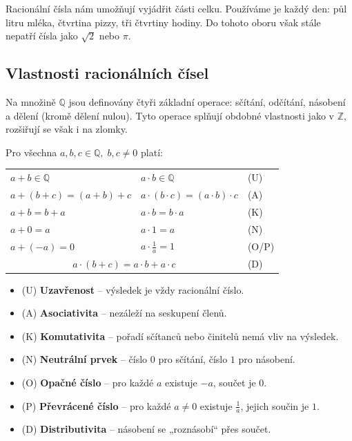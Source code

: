 \documentclass[12pt,a4paper]{article}
\begin{document}
\begin{notebox}
Racionální čísla nám umožňují vyjádřit části celku.  
Používáme je každý den: půl litru mléka, čtvrtina pizzy, tři čtvrtiny hodiny.  
Do tohoto oboru však stále nepatří čísla jako $\sqrt{2}$ nebo $\pi$.
\end{notebox}

\newpage
\subsection*{Vlastnosti racionálních čísel}

Na množině $\mathbb{Q}$ jsou definovány čtyři základní operace: sčítání, odčítání, násobení a dělení (kromě dělení nulou).  
Tyto operace splňují obdobné vlastnosti jako v $\mathbb{Z}$, rozšiřují se však i na zlomky.

\begin{definitionbox}
Pro všechna $a,b,c \in \mathbb{Q}, \; b,c \neq 0$ platí:

\begin{tabular}{p{5cm} p{5cm} p{2cm}}
$a+b \in \mathbb{Q}$ & $a \cdot b \in \mathbb{Q}$ & \hfill(U) \\
$a+(b+c) = (a+b)+c$ & $a \cdot (b \cdot c) = (a \cdot b)\cdot c$ & \hfill(A) \\
$a+b = b+a$ & $a \cdot b = b \cdot a$ & \hfill(K) \\
$a+0 = a$ & $a \cdot 1 = a$ & \hfill(N) \\
$a+(-a)=0$ & $a \cdot \tfrac{1}{a} = 1$ & \hfill(O/P) \\
\multicolumn{2}{c}{ $a \cdot (b+c) = a\cdot b + a\cdot c$ } & \hfill(D) \\
\end{tabular}
\end{definitionbox}

\noindent
\begin{itemize}
    \item (U) \textbf{Uzavřenost} – výsledek je vždy racionální číslo.  
    \item (A) \textbf{Asociativita} – nezáleží na seskupení členů.  
    \item (K) \textbf{Komutativita} – pořadí sčítanců nebo činitelů nemá vliv na výsledek.  
    \item (N) \textbf{Neutrální prvek} – číslo $0$ pro sčítání, číslo $1$ pro násobení.  
    \item (O) \textbf{Opačné číslo} – pro každé $a$ existuje $-a$, součet je $0$.  
    \item (P) \textbf{Převrácené číslo} – pro každé $a \neq 0$ existuje $\tfrac{1}{a}$, jejich součin je $1$.  
    \item (D) \textbf{Distributivita} – násobení se „roznásobí“ přes součet.  
\end{itemize}
\end{document}
